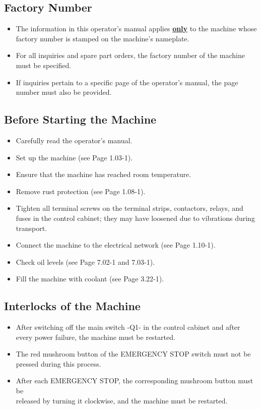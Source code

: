 

\subsection{Factory Number}
\begin{itemize}
    \item The information in this operator's manual applies \uline{\textbf{only}} to the machine whose factory number is stamped on the machine's nameplate.
    \item For all inquiries and spare part orders, the factory number of the machine must be specified.
    \item If inquiries pertain to a specific page of the operator's manual, the page number must also be provided.
\end{itemize}

\subsection{Before Starting the Machine}
\begin{itemize}
    \item Carefully read the operator's manual.
    \item Set up the machine (see Page 1.03-1).
    \item Ensure that the machine has reached room temperature.
    \item Remove rust protection (see Page 1.08-1).
    \item Tighten all terminal screws on the terminal strips, contactors, relays, and fuses in the control cabinet; they may have loosened due to vibrations during transport.
    \item Connect the machine to the electrical network (see Page 1.10-1).
    \item Check oil levels (see Page 7.02-1 and 7.03-1).
    \item Fill the machine with coolant (see Page 3.22-1).
\end{itemize}

\subsection{Interlocks of the Machine}
\begin{itemize}
    \item After switching off the main switch -Q1- in the control cabinet and after every power failure, the machine must be restarted.\footnotemark[1]
    \item The red mushroom button of the EMERGENCY STOP switch must not be pressed during this process.
    \item After each EMERGENCY STOP, the corresponding mushroom button must be \\released by turning it clockwise, and the machine must be restarted.\textsuperscript{\footnotemark[1]}
\end{itemize}

